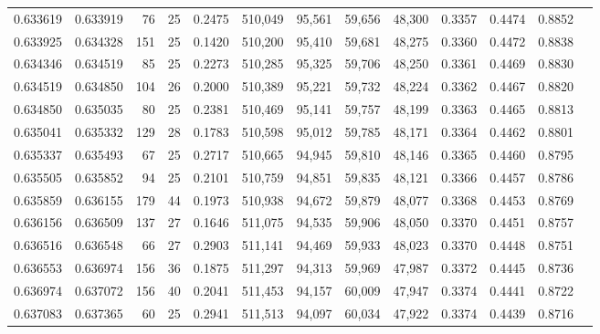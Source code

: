 \begin{tabular}{rrrrrrrrrrrrr}
0.633619 & 0.633919 &    76 &  25 &                                     0.2475 & 510,049 &  95,561 &  59,656 &  48,300 & 0.3357 & 0.4474 & 0.8852 \\
0.633925 & 0.634328 &   151 &  25 &                                     0.1420 & 510,200 &  95,410 &  59,681 &  48,275 & 0.3360 & 0.4472 & 0.8838 \\
0.634346 & 0.634519 &    85 &  25 &                                     0.2273 & 510,285 &  95,325 &  59,706 &  48,250 & 0.3361 & 0.4469 & 0.8830 \\
0.634519 & 0.634850 &   104 &  26 &                                     0.2000 & 510,389 &  95,221 &  59,732 &  48,224 & 0.3362 & 0.4467 & 0.8820 \\
0.634850 & 0.635035 &    80 &  25 &                                     0.2381 & 510,469 &  95,141 &  59,757 &  48,199 & 0.3363 & 0.4465 & 0.8813 \\
0.635041 & 0.635332 &   129 &  28 &                                     0.1783 & 510,598 &  95,012 &  59,785 &  48,171 & 0.3364 & 0.4462 & 0.8801 \\
0.635337 & 0.635493 &    67 &  25 &                                     0.2717 & 510,665 &  94,945 &  59,810 &  48,146 & 0.3365 & 0.4460 & 0.8795 \\
0.635505 & 0.635852 &    94 &  25 &                                     0.2101 & 510,759 &  94,851 &  59,835 &  48,121 & 0.3366 & 0.4457 & 0.8786 \\
0.635859 & 0.636155 &   179 &  44 &                                     0.1973 & 510,938 &  94,672 &  59,879 &  48,077 & 0.3368 & 0.4453 & 0.8769 \\
0.636156 & 0.636509 &   137 &  27 &                                     0.1646 & 511,075 &  94,535 &  59,906 &  48,050 & 0.3370 & 0.4451 & 0.8757 \\
0.636516 & 0.636548 &    66 &  27 &                                     0.2903 & 511,141 &  94,469 &  59,933 &  48,023 & 0.3370 & 0.4448 & 0.8751 \\
0.636553 & 0.636974 &   156 &  36 &                                     0.1875 & 511,297 &  94,313 &  59,969 &  47,987 & 0.3372 & 0.4445 & 0.8736 \\
0.636974 & 0.637072 &   156 &  40 &                                     0.2041 & 511,453 &  94,157 &  60,009 &  47,947 & 0.3374 & 0.4441 & 0.8722 \\
0.637083 & 0.637365 &    60 &  25 &                                     0.2941 & 511,513 &  94,097 &  60,034 &  47,922 & 0.3374 & 0.4439 & 0.8716 \\

\end{tabular}
